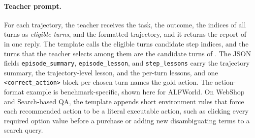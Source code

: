 \paragraph{Teacher prompt.} For each trajectory, the teacher receives the task, the outcome, the indices of all turns as \emph{eligible turns}, and the formatted trajectory, and it returns the report of  in one reply. The template calls the eligible turns candidate step indices, and the turns that the teacher selects among them are the candidate turns of . The JSON fields \texttt{episode\_summary}, \texttt{episode\_lesson}, and \texttt{step\_lessons} carry the trajectory summary, the trajectory-level lesson, and the per-turn lessons, and one \texttt{<correct\_action>} block per chosen turn names the gold action. The action-format example is benchmark-specific, shown here for ALFWorld. On WebShop and Search-based QA, the template appends short environment rules that force each recommended action to be a literal executable action, such as clicking every required option value before a purchase or adding new disambiguating terms to a search query.

